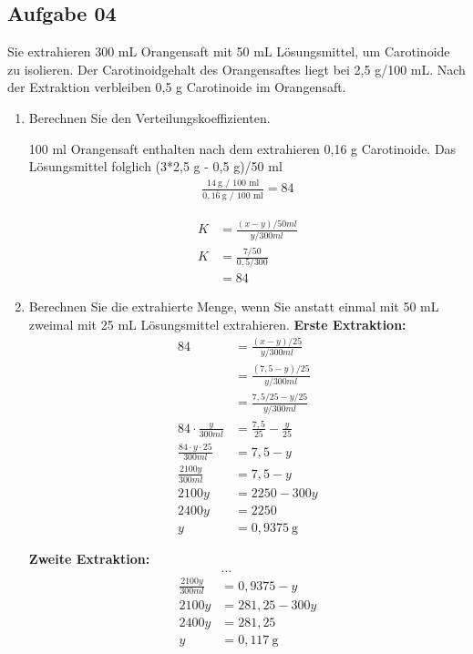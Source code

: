 \documentclass[a4paper,10pt]{article}
\begin{document}
\subsection*{Aufgabe 04}
Sie extrahieren 300 mL Orangensaft mit 50 mL Lösungsmittel, um Carotinoide zu isolieren.
Der Carotinoidgehalt des Orangensaftes liegt bei 2,5 g/100 mL. Nach der Extraktion
verbleiben 0,5 g Carotinoide im Orangensaft.
\begin{enumerate}[label=\alph*)]
\item Berechnen Sie den Verteilungskoeffizienten.
\par 100 ml Orangensaft enthalten nach dem extrahieren 0,16 g Carotinoide. Das Lösungsmittel folglich (3*2,5 g - 0,5 g)/50 ml
\begin{align*}
\frac{14~\text{g / 100 ml}}{0,1\overline{6}~\text{g / 100 ml}} = 84
\end{align*}

\begin{align*}
K &= \frac{(x - y) / 50ml}{y / 300ml}  \\
K &= \frac{7/50}{0,5/300} \\
 &= 84
\end{align*}
\item Berechnen Sie die extrahierte Menge, wenn Sie anstatt einmal mit 50 mL zweimal mit 25
mL Lösungsmittel extrahieren.
\pp
\textbf{Erste Extraktion:}
\begin{align*}
84 &= \frac{(x-y)/25}{y/300ml} \\
&= \frac{(7,5-y)/25}{y/300ml} \\
&= \frac{7,5/25 - y/25}{y/300ml} \\
84 \cdot \frac{y}{300ml} &= \frac{7,5}{25} - \frac{y}{25} \\
\frac{84 \cdot y \cdot 25}{300ml} &= 7,5 - y \\
\frac{2100y}{300ml} &= 7,5 - y \\
2100y &= 2250 - 300y \\
2400y &= 2250 \\
y &= 0,9375 ~\text{g}
\end{align*}

\textbf{Zweite Extraktion:}
\begin{align*}
&... \\
\frac{2100y}{300ml} &= 0,9375 - y \\
2100y &= 281,25 - 300y \\
2400y &= 281,25\\
y &= 0,117 ~\text{g}
\end{align*}

\end{enumerate}
\end{document}
